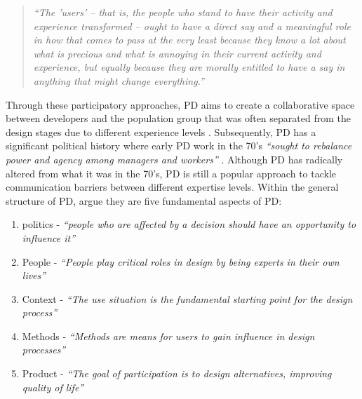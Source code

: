 \begin{quote}
\textit{``The 'users' – that is, the people who stand to have their activity and experience transformed – ought to have a direct say and a meaningful role in how that comes to pass at the very least because they know a lot about what is precious and what is annoying in their current activity and experience, but equally because they are morally entitled to have a say in anything that might change everything.'' \citep{carroll2007participatory}    
}\end{quote}

Through these participatory approaches, PD aims to create a collaborative space between developers and the population group that was often separated from the design stages due to different experience levels \citep{duarte2018participatory}. Subsequently, PD has a significant political history where early PD work in the 70's \textit{``sought to rebalance power and agency among managers and workers''} \citep{bannon2018introduction}. Although PD has radically altered from what it was in the 70's, PD is still a popular approach to tackle communication barriers between different expertise levels. 
Within the general structure of PD, \cite{halskov2015diversity} argue they are five fundamental aspects of PD:
\begin{enumerate}
\item politics - \textit{``people who are affected by a decision should have an opportunity to influence it''}
\item People - \textit{``People play critical roles in design by being experts in their own lives''}
\item Context - \textit{``The use situation is the fundamental starting point for the design process''}
\item Methods - \textit{``Methods are means for users to gain influence in design processes''}
\item Product - \textit{``The goal of participation is to design alternatives, improving quality of life''}
\end{enumerate}

